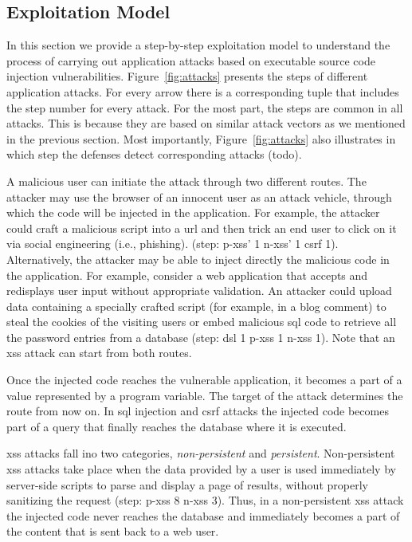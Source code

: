 \documentclass[conference]{IEEEtran}
\begin{document}

\subsection{Exploitation Model}
\label{sec:model}

In this section we provide a step-by-step exploitation model to
understand the process of carrying out application attacks based on
executable source code injection vulnerabilities.
Figure~\ref{fig:attacks} presents the steps of different application
attacks. For every arrow there is a
corresponding tuple that includes the step number for
every attack. For the most part, the steps are common in all attacks. This
is because they are based on similar attack vectors as we mentioned in
the previous section. Most importantly,
Figure~\ref{fig:attacks} also illustrates in which step
the defenses detect corresponding attacks ({\sc todo}).

A malicious user can initiate the attack through two different routes.
The attacker may use the browser of an innocent user as an attack
vehicle, through which the code will be injected in the application.
For example, the attacker could craft a malicious script into a {\sc url}
and then trick an end user to click on it via social engineering (i.e., phishing).
({\sc step}: {\sc p-xss}' 1 \text{\textbar} {\sc n-xss}' 1 \text{\textbar} {\sc csrf} 1).
Alternatively, the attacker may be able to inject
directly the malicious code in the application. For example, consider
a web application that accepts and redisplays user input
without appropriate validation. An attacker could
upload data containing a specially crafted script (for example, in a
blog comment) to steal the cookies of the visiting users or embed
malicious {\sc sql} code to retrieve all the password entries from a
database ({\sc step}: {\sc dsl} 1 \text{\textbar}
{\sc p-xss} 1 \text{\textbar} {\sc n-xss} 1).
Note that an {\sc xss} attack can start from both routes.

Once the injected code reaches the vulnerable application, it becomes
a part of a value represented by a program variable. The target of the
attack determines the route from now on. In {\sc sql} injection and
{\sc csrf} attacks the injected code becomes part of a query that
finally reaches the database where it is executed. 

{\sc xss} attacks fall ino two categories, {\it non-persistent} and
{\it persistent}. Non-persistent {\sc xss} attacks take place when the
data provided by a user is used immediately by server-side scripts to
parse and display a page of results, without properly sanitizing the
request ({\sc step}: {\sc p-xss} 8 \text{\textbar} {\sc n-xss} 3).
Thus, in a non-persistent {\sc xss} attack the injected code
never reaches the database and immediately becomes a part of the
content that is sent back to a web user.
\end{document}
